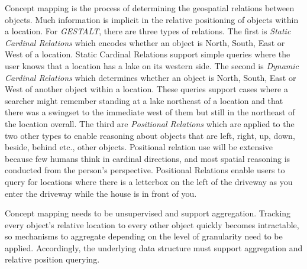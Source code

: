 Concept mapping is the process of determining the geospatial relations between objects. Much information is implicit in the relative positioning of objects within a location. For \textit{GESTALT}, there are three types of relations. 
The first is \textit{Static Cardinal Relations} which encodes whether an object is North, South, East or West of a location. Static Cardinal Relations support simple queries where the user knows that a location has a lake on its western side. 
The second is \textit{Dynamic Cardinal Relations} which determines whether an object is North, South, East or West of another object within a location. These queries support cases where a searcher might remember standing at a lake northeast of a location and that there was a swingset to the immediate west of them but still in the northeast of the location overall. 
The third are \textit{Positional Relations} which are applied to the two other types to enable reasoning about objects that are left, right, up, down, beside, behind etc., other objects. 
Positional relation use will be extensive because few humans think in cardinal directions, and most spatial reasoning is conducted from the person's perspective. 
Positional Relations enable users to query for locations where there is a letterbox on the left of the driveway as you enter the driveway while the house is in front of you. 

Concept mapping needs to be unsupervised and support aggregation. Tracking every object's relative location to every other object quickly becomes intractable, so mechanisms to aggregate depending on the level of granularity need to be applied. 
Accordingly, the underlying data structure must support aggregation and relative position querying. 
